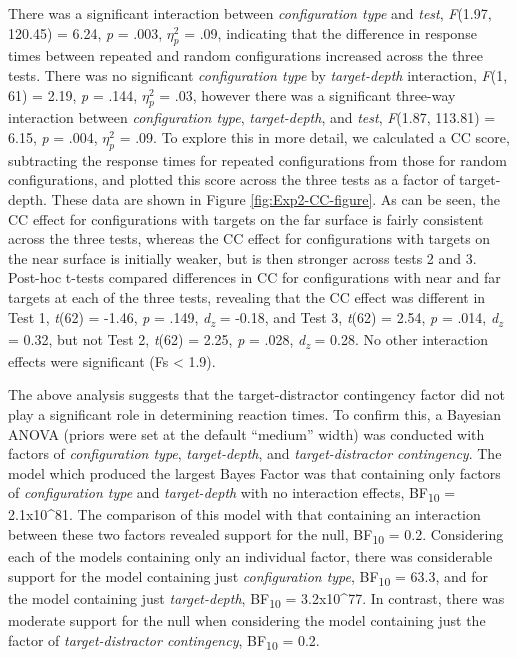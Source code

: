 \documentclass[
  english,
  man,floatsintext]{apa7}
\begin{document}
There was a significant interaction between \emph{configuration type} and \emph{test}, \emph{F}(1.97, 120.45) = 6.24, \emph{p} = .003, \(\eta^2_p\) = .09, indicating that the difference in response times between repeated and random configurations increased across the three tests. There was no significant \emph{configuration type} by \emph{target-depth} interaction, \emph{F}(1, 61) = 2.19, \emph{p} = .144, \(\eta^2_p\) = .03, however there was a significant three-way interaction between \emph{configuration type}, \emph{target-depth}, and \emph{test}, \emph{F}(1.87, 113.81) = 6.15, \emph{p} = .004, \(\eta^2_p\) = .09. To explore this in more detail, we calculated a CC score, subtracting the response times for repeated configurations from those for random configurations, and plotted this score across the three tests as a factor of target-depth. These data are shown in Figure \ref{fig:Exp2-CC-figure}. As can be seen, the CC effect for configurations with targets on the far surface is fairly consistent across the three tests, whereas the CC effect for configurations with targets on the near surface is initially weaker, but is then stronger across tests 2 and 3. Post-hoc t-tests compared differences in CC for configurations with near and far targets at each of the three tests, revealing that the CC effect was different in Test 1, \emph{t}(62) = -1.46, \emph{p} = .149, \emph{d\textsubscript{z}} = -0.18, and Test 3, \emph{t}(62) = 2.54, \emph{p} = .014, \emph{d\textsubscript{z}} = 0.32, but not Test 2, \emph{t}(62) = 2.25, \emph{p} = .028, \emph{d\textsubscript{z}} = 0.28. No other interaction effects were significant (Fs \textless{} 1.9).

The above analysis suggests that the target-distractor contingency factor did not play a significant role in determining reaction times. To confirm this, a Bayesian ANOVA (priors were set at the default ``medium'' width) was conducted with factors of \emph{configuration type}, \emph{target-depth}, and \emph{target-distractor contingency}. The model which produced the largest Bayes Factor was that containing only factors of \emph{configuration type} and \emph{target-depth} with no interaction effects, BF\textsubscript{10} = 2.1x10\^{}81. The comparison of this model with that containing an interaction between these two factors revealed support for the null, BF\textsubscript{10} = 0.2. Considering each of the models containing only an individual factor, there was considerable support for the model containing just \emph{configuration type}, BF\textsubscript{10} = 63.3, and for the model containing just \emph{target-depth}, BF\textsubscript{10} = 3.2x10\^{}77. In contrast, there was moderate support for the null when considering the model containing just the factor of \emph{target-distractor contingency}, BF\textsubscript{10} = 0.2.
\end{document}
